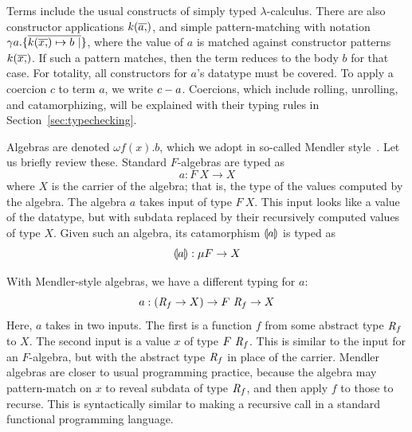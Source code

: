 \documentclass[pdflatex,sn-mathphys-num]{sn-jnl}%
\theoremstyle{thmstyleone}%
\theoremstyle{thmstyletwo}%
\theoremstyle{thmstylethree}%
\begin{document}
Terms include the usual constructs of simply typed
$\lambda$-calculus. There are also constructor applications
$k(\overline{a ,})$, and simple pattern-matching with notation $\gamma a
. \{ \overline{k(\overline{x ,}) \mapsto b ~|} \}$, where the value of $a$
is matched against constructor patterns $k(\overline{x ,})$.  If such a
pattern matches, then the term reduces to the body $b$ for that
case. For totality, all constructors for $a$'s datatype must be
covered. To apply a coercion $c$ to term $a$, we write
$c - a$.  Coercions, which include rolling, unrolling, and
catamorphizing, will be explained with their typing rules in
Section~\ref{sec:typechecking}.

Algebras are denoted $\omega f(x) . b$, which we adopt in so-called
Mendler style~\cite{uustalu99}.  Let us briefly review these.
Standard $F$-algebras are typed as
\[
a : F\ X \to X
\]
\noindent where $X$ is the carrier of the algebra; that is, the type
of the values computed by the algebra.  The algebra $a$ takes input of
type $F\ X$.  This input looks like a value of the datatype, but with
subdata replaced by their recursively computed values of type $X$.
Given such an algebra, its catamorphism $\llparenthesis a \rrparenthesis$ is typed as
\[
\llparenthesis a \rrparenthesis : \mu F \to X
\]

\noindent With Mendler-style algebras, we have a different typing for $a$:
\[
a : (\textit{R}_{f} \to X) \to F\ \textit{R}_{f} \to X
\]
\noindent Here, $a$ takes in two inputs.  The first is a function $f$
from some abstract type $\textit{R}_{f}$ to $X$. The second input is a
value $x$ of type $F ~ \textit{R}_{f}$.  This is similar to
the input for an $F$-algebra, but with the abstract type $\textit{R}_{f}$
in place of the carrier.  Mendler algebras are closer to usual
programming practice, because the algebra may pattern-match on $x$ to
reveal subdata of type $\textit{R}_{f}$, and then apply $f$ to those to
recurse.  This is syntactically similar to making a recursive call in
a standard functional programming language.
\end{document}
